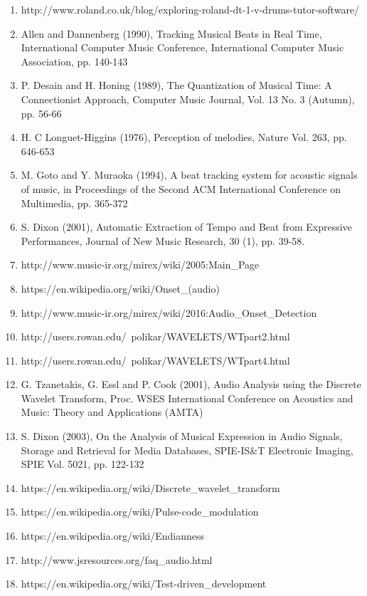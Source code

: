 \documentclass[a4paper, 11pt]{article}
\begin{document}
\begin{enumerate}
\item http://www.roland.co.uk/blog/exploring-roland-dt-1-v-drums-tutor-software/ %
\item Allen and Dannenberg (1990), Tracking Musical Beats in Real Time, International Computer Music Conference, International Computer Music Association, pp. 140-143 %
\item P. Desain and H. Honing (1989), The Quantization of Musical Time: A Connectionist Approach, Computer Music Journal, Vol. 13 No. 3 (Autumn), pp. 56-66 %
\item H. C Longuet-Higgins (1976), Perception of melodies, Nature Vol. 263, pp. 646-653 %
\item M. Goto and Y. Muraoka (1994), A beat tracking system for acoustic signals of music, in Proceedings of the Second ACM International Conference on Multimedia, pp. 365-372 %
\item S. Dixon (2001), Automatic Extraction of Tempo and Beat from Expressive Performances, Journal of New Music Research, 30 (1), pp. 39-58. %
\item http://www.music-ir.org/mirex/wiki/2005:Main\_Page %
\item https://en.wikipedia.org/wiki/Onset\_(audio) %
\item http://www.music-ir.org/mirex/wiki/2016:Audio\_Onset\_Detection %
\item http://users.rowan.edu/~polikar/WAVELETS/WTpart2.html %
\item http://users.rowan.edu/~polikar/WAVELETS/WTpart4.html %
\item G. Tzanetakis, G. Essl and P. Cook (2001), Audio Analysis using the Discrete Wavelet Transform, Proc. WSES International Conference on Acoustics and Music: Theory and Applications (AMTA) %
\item S. Dixon (2003), On the Analysis of Musical Expression in Audio Signals, Storage and Retrieval for Media Databases, SPIE-IS\&T Electronic Imaging, SPIE Vol. 5021, pp. 122-132 %
\item https://en.wikipedia.org/wiki/Discrete\_wavelet\_transform %
\item https://en.wikipedia.org/wiki/Pulse-code\_modulation %
\item https://en.wikipedia.org/wiki/Endianness %
\item http://www.jsresources.org/faq\_audio.html %
\item https://en.wikipedia.org/wiki/Test-driven\_development %

\end{enumerate}
\end{document}
